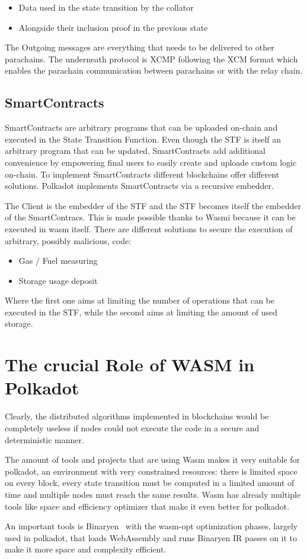 \begin{itemize}
  \item Data used in the state transition by the collator
  \item Alongside their inclusion proof in the previous state
\end{itemize}

The Outgoing messages are everything that needs to be delivered to other parachains. The underneath protocol is XCMP following the XCM format which enables the parachain communication between parachains or with the relay chain.

\subsection{SmartContracts}

SmartContracts are arbitrary programs that can be uploaded on-chain and executed in the State Transition Function. Even though the STF is itself an arbitrary program that can be updated,  SmartContracts add additional convenience by empowering final users to easily create and uploade custom logic on-chain. To implement SmartContracts different blockchains offer different solutions. Polkadot implements SmartContracts via a recursive embedder.


The Client is the embedder of the STF and the STF becomes itself the embedder of the SmartContracs. This is made possible thanks to Wasmi because it can be executed in wasm itself. There are different solutions to secure the execution of arbitrary, possibly malicious, code:

\begin{itemize}
  \item Gas / Fuel measuring
  \item Storage usage deposit
\end{itemize}

Where the first one aims at limiting the number of operations that can be executed in the STF, while  the second aims at limiting the amount of used storage.

\section{The crucial Role of WASM in Polkadot}

Clearly, the distributed algorithms implemented in blockchains would be completely useless if nodes could not execute the code in a secure and deterministic manner.

The amount of tools and projects that are using Wasm makes it very suitable for polkadot, an environment with very constrained resources: there is limited space on every block, every state transition must be computed in a limited amount of time and multiple nodes must reach the same results. Wasm has already multiple tools like space and efficiency optimizer that make it even better for polkadot.

An important tools is Binaryen~\cite{binaryen} with the wasm-opt optimization phases, largely used in polkadot, that loads WebAssembly and runs Binaryen IR passes on it to make it more space and complexity efficient.

